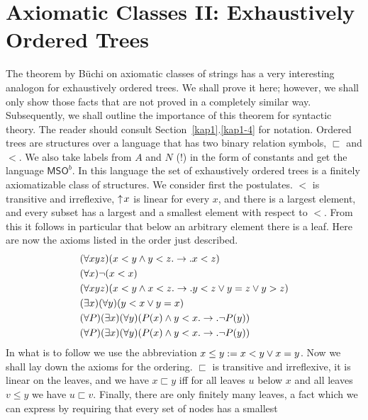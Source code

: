 \section{Axiomatic Classes II: Exhaustively Ordered Trees}
\label{kap5-4}%
\nocite{doner:tree}%
\nocite{thatcherwright}%
%
%
%
The theorem by B\"uchi on axiomatic classes of strings has a
very interesting analogon for exhaustively ordered trees.
We shall prove it here; however, we shall only show those
facts that are not proved in a completely similar way.
Subsequently, we shall outline the importance of this
theorem for syntactic theory. The reader should consult
Section~\ref{kap1}.\ref{kap1-4} for notation. Ordered
trees are structures over a language that has two binary
relation symbols, $\sqsubset$ and $<$. We also take
labels from $A$ and $N$ (!) in the form of constants
and get the language $\mathsf{MSO}^b$. 
In this language the
set of exhaustively ordered trees is a finitely
axiomatizable class of structures. We consider first
the postulates. $<$ is transitive and irreflexive,
${\uparrow\! x}$ is linear for every $x$, and there is a largest
element, and every subset has a largest and a smallest element
with respect to  $<$. From this it follows in particular that
below an arbitrary element there is a leaf. Here are now the
axioms listed in the order just described.
\begin{subequations}
\begin{align}
& (\forall xyz)(x < y \wedge y < z .\rightarrow. x < z) \\
& (\forall x)\neg (x < x) \\
& (\forall xyz)(x < y \wedge x < z. \rightarrow . y < z \vee y = z \vee
    y > z) \\
& (\exists x)(\forall y)(y < x \vee y = x) \\
& (\forall P)(\exists x)(\forall y)(P(x) \wedge y < x .\rightarrow.
    \neg P(y)) \\
& (\forall P)(\exists x)(\forall y)(P(x) \wedge y < x .\rightarrow.
    \neg P(y))
\end{align}
\end{subequations}
In what is to follow we use the abbreviation $x \leq y := x < y \vee
x = y$. Now we shall lay down the axioms for the ordering.
$\sqsubset$ is transitive and irreflexive, it is linear on the
leaves, and we have $x \sqsubset y$ iff for all leaves
$u$ below $x$ and all leaves $v \leq y$ we have $u \sqsubset v$.
Finally, there are only finitely many leaves, a fact which we can
express by requiring that every set of nodes has a smallest
